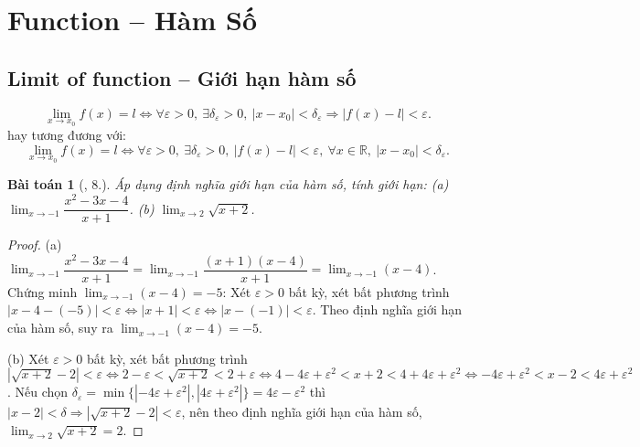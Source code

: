 \documentclass{article}
\newtheorem{baitoan}{Bài toán}
\begin{document}

\section{Function -- Hàm Số}


\subsection{Limit of function -- Giới hạn hàm số}

\begin{equation*}
	\lim_{x\to x_0} f(x) = l\Leftrightarrow\forall\varepsilon > 0,\ \exists\delta_\varepsilon > 0,\ |x - x_0| < \delta_\varepsilon\Rightarrow|f(x) - l| < \varepsilon.
\end{equation*}
hay tương đương với:
\begin{equation*}
	\lim_{x\to x_0} f(x) = l\Leftrightarrow\forall\varepsilon > 0,\ \exists\delta_\varepsilon > 0,\ |f(x) - l| < \varepsilon,\ \forall x\in\mathbb{R},\ |x - x_0| < \delta_\varepsilon.
\end{equation*}

\begin{baitoan}[\cite{TLCT_dai_so_giai_tich_11}, 8.]
	Áp dụng định nghĩa giới hạn của hàm số, tính giới hạn: (a) $\lim_{x\to-1} \dfrac{x^2 - 3x - 4}{x + 1}$. (b) $\lim_{x\to2} \sqrt{x + 2}$.
\end{baitoan}

\begin{proof}
	(a) $\lim_{x\to-1} \dfrac{x^2 - 3x - 4}{x + 1} = \lim_{x\to-1} \dfrac{(x + 1)(x - 4)}{x + 1} = \lim_{x\to-1} (x - 4)$. Chứng minh $\lim_{x\to-1} (x - 4) = -5$: Xét $\varepsilon > 0$ bất kỳ, xét bất phương trình $|x - 4 - (-5)| < \varepsilon\Leftrightarrow|x + 1| < \varepsilon\Leftrightarrow|x - (-1)| < \varepsilon$. Theo định nghĩa giới hạn của hàm số, suy ra $\lim_{x\to-1} (x - 4) = -5$.
	
	\item(b)  Xét $\varepsilon > 0$ bất kỳ, xét bất phương trình $|\sqrt{x + 2} - 2| < \varepsilon\Leftrightarrow2 - \varepsilon < \sqrt{x + 2} < 2 + \varepsilon\Leftrightarrow4 - 4\varepsilon + \varepsilon^2 < x + 2 < 4 + 4\varepsilon + \varepsilon^2\Leftrightarrow-4\varepsilon + \varepsilon^2 < x - 2 < 4\varepsilon + \varepsilon^2$. Nếu chọn $\delta_\varepsilon = \min\{|-4\varepsilon + \varepsilon^2|,|4\varepsilon + \varepsilon^2|\} = 4\varepsilon - \varepsilon^2$ thì $|x - 2| < \delta\Rightarrow|\sqrt{x + 2} - 2| < \varepsilon$, nên theo định nghĩa giới hạn của hàm số, $\lim_{x\to2} \sqrt{x + 2} = 2$.
\end{proof}
\end{document}
